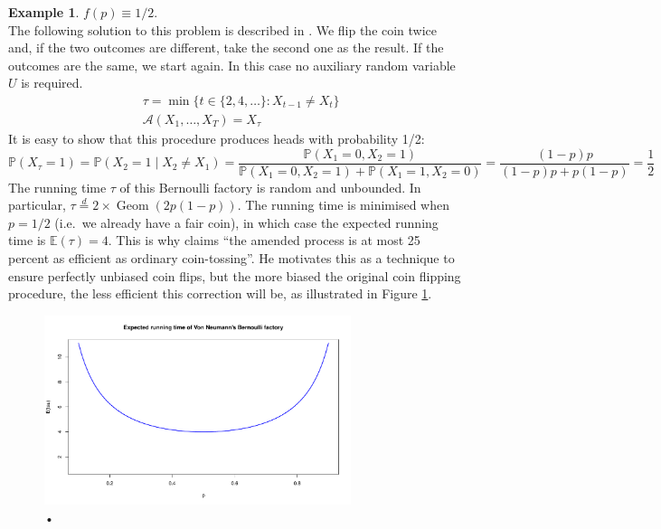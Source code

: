 \documentclass{article}
\theoremstyle{definition}
\newtheorem{example}{Example}
\newcommand{\PR}{\mathbb{P}}
\newcommand{\E}{\mathbb{E}}
\newcommand{\eqdist}{\overset{d}{=}}
\newcommand{\Geom}{\operatorname{Geom}}
\newcommand{\A}{\mathcal{A}}
\begin{document}
\begin{example}
$f(p) \equiv 1/2$.\\
The following solution to this problem is described in \citet{vonneumann1951}.
We flip the coin twice and, if the two outcomes are different, take the second one as the result. If the outcomes are the same, we start again.
In this case no auxiliary random variable $U$ is required.
\begin{align*}
& \tau = \min\{ t \in \{2,4,\dots\} : X_{t-1} \neq X_t \} \\
& \A(X_1,\dots,X_T) = X_\tau
\end{align*}
It is easy to show that this procedure produces heads with probability 1/2:
\begin{equation*}
\PR(X_\tau = 1) = \PR(X_2 = 1 \mid X_2\neq X_1) = \frac{\PR(X_1 = 0, X_2 = 1)}{\PR(X_1 = 0, X_2 = 1) + \PR(X_1 = 1, X_2 = 0)} = \frac{(1-p)p}{(1-p)p + p(1-p)} = \frac{1}{2}
\end{equation*}
The running time $\tau$ of this Bernoulli factory is random and unbounded. In particular, 
$\tau \eqdist 2\times\Geom(2p(1-p))$. The running time is minimised when $p=1/2$ (i.e.\ we already have a fair coin), in which case the expected running time is $\E(\tau)=4$. This is why \citet{vonneumann1951} claims ``the amended process is at most 25 percent as efficient as ordinary coin-tossing''. He motivates this as a technique to ensure perfectly unbiased coin flips, but the more biased the original coin flipping procedure, the less efficient this correction will be, as illustrated in Figure \ref{fig:vonneumann_runtime}.
\begin{figure}
\centering
\includegraphics[width=0.8\textwidth]{vonneumann_runtime.pdf}
\caption{•}\label{fig:vonneumann_runtime}
\end{figure}
\end{example}
\end{document}
